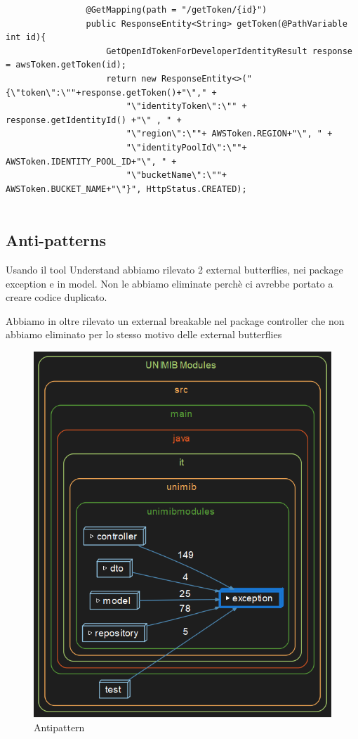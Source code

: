 \documentclass[12pt]{article}
\begin{document}
\begin{itemize}
\begin{lstlisting}
				@GetMapping(path = "/getToken/{id}")
				public ResponseEntity<String> getToken(@PathVariable int id){
					GetOpenIdTokenForDeveloperIdentityResult response = awsToken.getToken(id);
					return new ResponseEntity<>("{\"token\":\""+response.getToken()+"\"," +
						"\"identityToken\":\"" + response.getIdentityId() +"\" , " +
						"\"region\":\""+ AWSToken.REGION+"\", " +
						"\"identityPoolId\":\""+ AWSToken.IDENTITY_POOL_ID+"\", " +
						"\"bucketName\":\""+ AWSToken.BUCKET_NAME+"\"}", HttpStatus.CREATED);
					
				\end{lstlisting}
				
			\end{itemize}
			\newpage
			\subsection{Anti-patterns}
			Usando il tool Understand abbiamo rilevato 2 external butterflies, nei package exception e in model. Non le abbiamo eliminate perchè ci avrebbe portato a creare codice duplicato.
			
			Abbiamo in oltre rilevato un external breakable nel package controller che non abbiamo eliminato per lo stesso motivo delle external butterflies
			\begin{figure}[H]
				\centering
				\includegraphics[scale=0.47]{Antipattern.png}
				\caption{Antipattern}
			\end{figure}
			\newpage
\end{document}
